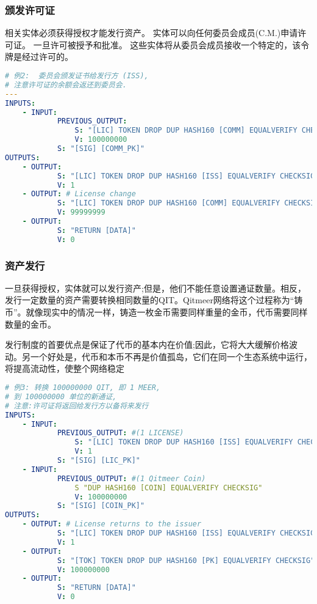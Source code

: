 \documentclass[a4paper,11pt]{article}
\begin{document}
\subsubsection{颁发许可证}


相关实体必须获得授权才能发行资产。
实体可以向任何委员会成员(C.M.)申请许可证。
一旦许可被授予和批准。
这些实体将从委员会成员接收一个特定的，该令牌是经过许可的。

\lstset{basicstyle=\tiny,style=myListStyle}
\begin{lstlisting}[language=yaml, numbers=none,basicstyle=\footnotesize]
# 例2:  委员会颁发证书给发行方 (ISS),
# 注意许可证的余额会返还到委员会.
---
INPUTS:
	- INPUT:
			PREVIOUS_OUTPUT:
				S: "[LIC] TOKEN DROP DUP HASH160 [COMM] EQUALVERIFY CHECKSIG"
				V: 100000000
			S: "[SIG] [COMM_PK]"
OUTPUTS:
	- OUTPUT:
			S: "[LIC] TOKEN DROP DUP HASH160 [ISS] EQUALVERIFY CHECKSIG"
			V: 1
	- OUTPUT: # License change
			S: "[LIC] TOKEN DROP DUP HASH160 [COMM] EQUALVERIFY CHECKSIG"
			V: 99999999
	- OUTPUT:
			S: "RETURN [DATA]"
			V: 0
\end{lstlisting}

\subsubsection{资产发行}
一旦获得授权，实体就可以发行资产;但是，他们不能任意设置通证数量。相反，发行一定数量的资产需要转换相同数量的QIT。Qitmeer网络将这个过程称为“铸币”。就像现实中的情况一样，铸造一枚金币需要同样重量的金币，代币需要同样数量的金币。

发行制度的首要优点是保证了代币的基本内在价值;因此，它将大大缓解价格波动。另一个好处是，代币和本币不再是价值孤岛，它们在同一个生态系统中运行，将提高流动性，使整个网络稳定

\lstset{basicstyle=\tiny,style=myListStyle}
\begin{lstlisting}[language=yaml, numbers=none,basicstyle=\footnotesize]
# 例3: 转换 100000000 QIT, 即 1 MEER,
# 到 100000000 单位的新通证,
# 注意:许可证将返回给发行方以备将来发行
INPUTS:
	- INPUT:
			PREVIOUS_OUTPUT: #(1 LICENSE)
				S: "[LIC] TOKEN DROP DUP HASH160 [ISS] EQUALVERIFY CHECKSIG"
				V: 1
			S: "[SIG] [LIC_PK]"
	- INPUT:
			PREVIOUS_OUTPUT: #(1 Qitmeer Coin)
				S "DUP HASH160 [COIN] EQUALVERIFY CHECKSIG"
				V: 100000000
			S: "[SIG] [COIN_PK]"
OUTPUTS:
	- OUTPUT: # License returns to the issuer
			S: "[LIC] TOKEN DROP DUP HASH160 [ISS] EQUALVERIFY CHECKSIG"
			V: 1
	- OUTPUT:
			S: "[TOK] TOKEN DROP DUP HASH160 [PK] EQUALVERIFY CHECKSIG"
			V: 100000000
	- OUTPUT:
			S: "RETURN [DATA]"
			V: 0
\end{lstlisting}
\end{document}

